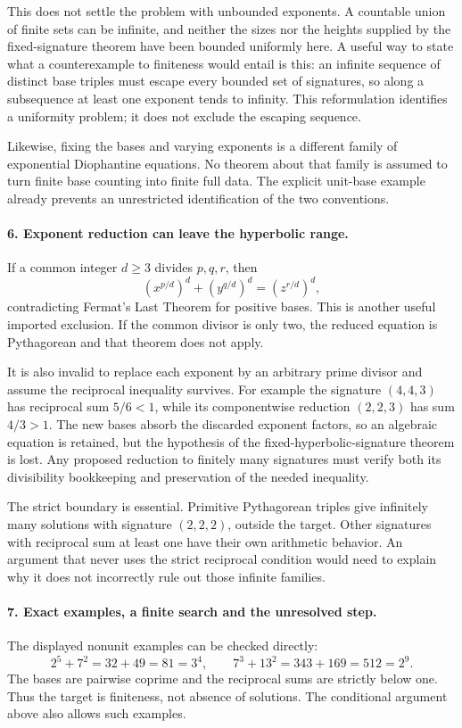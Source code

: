 \documentclass[11pt]{article}
\begin{document}
This does not settle the problem with unbounded exponents. A countable union of finite sets can be infinite, and neither the sizes nor the heights supplied by the fixed-signature theorem have been bounded uniformly here. A useful way to state what a counterexample to finiteness would entail is this: an infinite sequence of distinct base triples must escape every bounded set of signatures, so along a subsequence at least one exponent tends to infinity. This reformulation identifies a uniformity problem; it does not exclude the escaping sequence.

Likewise, fixing the bases and varying exponents is a different family of exponential Diophantine equations. No theorem about that family is assumed to turn finite base counting into finite full data. The explicit unit-base example already prevents an unrestricted identification of the two conventions.

\paragraph{6. Exponent reduction can leave the hyperbolic range.}
If a common integer $d\ge3$ divides $p,q,r$, then
\[
 (x^{p/d})^d+(y^{q/d})^d=(z^{r/d})^d,
\]
contradicting Fermat's Last Theorem for positive bases. This is another useful imported exclusion. If the common divisor is only two, the reduced equation is Pythagorean and that theorem does not apply.

It is also invalid to replace each exponent by an arbitrary prime divisor and assume the reciprocal inequality survives. For example the signature $(4,4,3)$ has reciprocal sum $5/6<1$, while its componentwise reduction $(2,2,3)$ has sum $4/3>1$. The new bases absorb the discarded exponent factors, so an algebraic equation is retained, but the hypothesis of the fixed-hyperbolic-signature theorem is lost. Any proposed reduction to finitely many signatures must verify both its divisibility bookkeeping and preservation of the needed inequality.

The strict boundary is essential. Primitive Pythagorean triples give infinitely many solutions with signature $(2,2,2)$, outside the target. Other signatures with reciprocal sum at least one have their own arithmetic behavior. An argument that never uses the strict reciprocal condition would need to explain why it does not incorrectly rule out those infinite families.

\paragraph{7. Exact examples, a finite search and the unresolved step.}
The displayed nonunit examples can be checked directly:
\[
 2^5+7^2=32+49=81=3^4,
 \qquad
 7^3+13^2=343+169=512=2^9.
\]
The bases are pairwise coprime and the reciprocal sums are strictly below one. Thus the target is finiteness, not absence of solutions. The conditional argument above also allows such examples.
\end{document}

